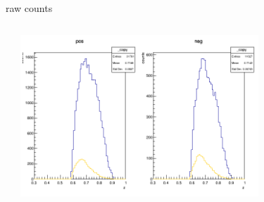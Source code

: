 \begin{frame}{raw counts}
\begin{columns}
\begin{column}[T]{0.5\textwidth}
\end{column}
\begin{column}[T]{0.5\textwidth}
\includegraphics[width = 0.7\textwidth]{results/yield/statistics/counts_x_Q2_z_0.50_5.000_0.70.png}
\end{column}
\end{columns}
\end{frame}
